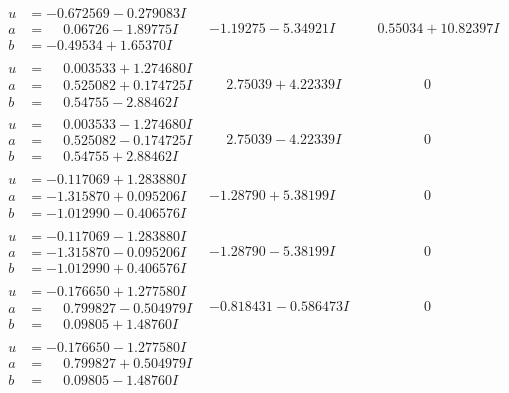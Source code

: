 \documentclass[1p]{elsarticle_modified}
\theoremstyle{definition}
\begin{document}
$$\begin{array}{c|c|c}
\begin{aligned}
u &= -0.672569 - 0.279083 I \\
a &= \phantom{-}0.06726 - 1.89775 I \\
b &= -0.49534 + 1.65370 I\end{aligned}
 & -1.19275 - 5.34921 I & \phantom{-}0.55034 + 10.82397 I \\ \hline\begin{aligned}
u &= \phantom{-}0.003533 + 1.274680 I \\
a &= \phantom{-}0.525082 + 0.174725 I \\
b &= \phantom{-}0.54755 - 2.88462 I\end{aligned}
 & \phantom{-}2.75039 + 4.22339 I & \phantom{-0.000000 } 0 \\ \hline\begin{aligned}
u &= \phantom{-}0.003533 - 1.274680 I \\
a &= \phantom{-}0.525082 - 0.174725 I \\
b &= \phantom{-}0.54755 + 2.88462 I\end{aligned}
 & \phantom{-}2.75039 - 4.22339 I & \phantom{-0.000000 } 0 \\ \hline\begin{aligned}
u &= -0.117069 + 1.283880 I \\
a &= -1.315870 + 0.095206 I \\
b &= -1.012990 - 0.406576 I\end{aligned}
 & -1.28790 + 5.38199 I & \phantom{-0.000000 } 0 \\ \hline\begin{aligned}
u &= -0.117069 - 1.283880 I \\
a &= -1.315870 - 0.095206 I \\
b &= -1.012990 + 0.406576 I\end{aligned}
 & -1.28790 - 5.38199 I & \phantom{-0.000000 } 0 \\ \hline\begin{aligned}
u &= -0.176650 + 1.277580 I \\
a &= \phantom{-}0.799827 - 0.504979 I \\
b &= \phantom{-}0.09805 + 1.48760 I\end{aligned}
 & -0.818431 - 0.586473 I & \phantom{-0.000000 } 0 \\ \hline\begin{aligned}
u &= -0.176650 - 1.277580 I \\
a &= \phantom{-}0.799827 + 0.504979 I \\
b &= \phantom{-}0.09805 - 1.48760 I\end{aligned}

\end{array}$$
\end{document}
